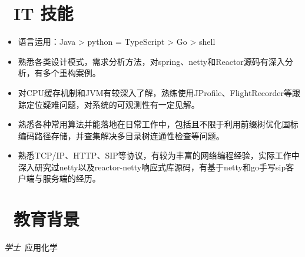\documentclass{resume}
\begin{document}
\section{\faCogs\ IT 技能}
\begin{itemize}[parsep=0.5ex]
  \item 语言运用：Java > python = TypeScript > Go > shell
  \item 熟悉各类设计模式，需求分析方法，对spring、netty和Reactor源码有深入分析，有多个重构案例。
  \item 对CPU缓存机制和JVM有较深入了解，熟练使用JProfile、FlightRecorder等跟踪定位疑难问题，对系统的可观测性有一定见解。
  \item 熟悉各种常用算法并能落地在日常工作中，包括且不限于利用前缀树优化国标编码路径存储，并查集解决多目录树连通性检查等问题。
  \item 熟悉TCP/IP、HTTP、SIP等协议，有较为丰富的网络编程经验，实际工作中深入研究过netty以及reactor-netty响应式库源码，有基于netty和go手写sip客户端与服务端的经历。
\end{itemize}

\section{\faGraduationCap\  教育背景}
\textit{学士}\ 应用化学

\end{document}
